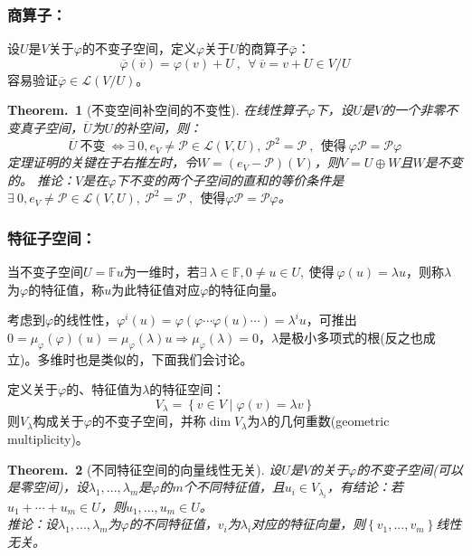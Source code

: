 \documentclass[zihao=-4,UTF8]{report}
\theoremstyle{mystyle} %
\newtheorem{theorem}{Theorem.\,}
\begin{document}
\subsubsection{商算子：}
设$U$是$V$关于$\varphi$的不变子空间，定义$\varphi$关于$U$的商算子$\overline{\varphi}$：
\begin{equation*}
    \overline{\varphi}(\overline{v}) =  \varphi(v) + U\ ,\ \ \forall\ \overline{v} = v + U \in V/U
\end{equation*}
容易验证$\overline{\varphi} \in \mathscr{L}(V/U)$。

\begin{theorem}[不变空间补空间的不变性]
在线性算子$\varphi$下，设$U$是$V$的一个非零不变真子空间，$\overline{U}$为$U$的补空间，则：
\begin{equation*}
    \overline{U} \ \text{不变}\ \Longleftrightarrow \exists \ 0,e_V \ne \mathscr{P} \in \mathscr{L}(V,U),\  \mathscr{P}^2 = \mathscr{P}\ ,\ \ \text{使得}\  \varphi \mathscr{P} = \mathscr{P} \varphi 
\end{equation*}
{\color{gray}\small 定理证明的关键在于右推左时，令$W = (e_V - \mathscr{P})(V) $，则$V = U \oplus W$且$W$是不变的。
推论：$V$是在$\varphi$下不变的两个子空间的直和的等价条件是$\exists \ 0,e_V \ne \mathscr{P} \in \mathscr{L}(V,U),\  \mathscr{P}^2 = \mathscr{P}\ ,\ \ \text{使得}  \varphi \mathscr{P} = \mathscr{P} \varphi$。}
\end{theorem}
\subsubsection{特征子空间：}
当不变子空间$U = \mathbb{F}u$为一维时，若$\exists \ \lambda \in \mathbb{F},0 \ne u \in U,\ \text{使得}\ \varphi(u) = \lambda u$，则称$\lambda$为$\varphi$的特征值，称$u$为此特征值对应$\varphi$的特征向量。\par
考虑到$\varphi$的线性性，$\varphi^i(u) = \varphi(\varphi\cdots \varphi(u)\cdots ) = \lambda^i u$，可推出$0 = \mu_{\varphi}(\varphi)(u) = \mu_{\varphi}(\lambda)u \Longrightarrow \mu_{\varphi}(\lambda) = 0$，$\lambda$是极小多项式的根(反之也成立)。{\color{gray}\small 多维时也是类似的，下面我们会讨论。}\par
定义关于$\varphi$的、特征值为$\lambda$的特征空间：
\begin{equation*}
    V_{\lambda} = \left\{v\in V \mid \varphi(v) = \lambda v \right\}
\end{equation*}
则$V_{\lambda}$构成关于$\varphi$的不变子空间，并称$\dim V_{\lambda}$为$\lambda$的几何重数(geometric multiplicity)。
\begin{theorem}[不同特征空间的向量线性无关]\label{不同特征空间的向量线性无关}
    设$U$是$V$的关于$\varphi$的不变子空间(可以是零空间)，设$\lambda_1,...,\lambda_m$是$\varphi$的$m$个不同特征值，且$u_i \in V_{\lambda_i}$，有结论：若$u_1 + \cdots + u_m \in U$，则$u_1,...,u_m \in U$。\\
    推论：设$\lambda_1,...,\lambda_m$为$\varphi$的不同特征值，$v_i$为$\lambda_i$对应的特征向量，则$\left\{v_1,...,v_m \right\}$线性无关。
\end{theorem}
\end{document}
